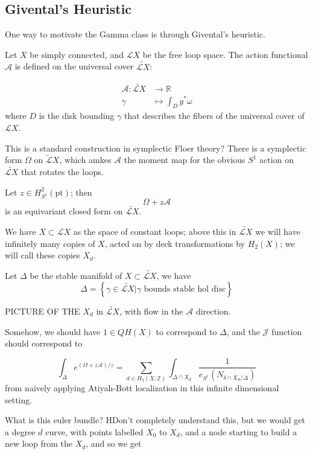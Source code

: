 \documentclass{amsart}
\theoremstyle{definition}
\newcommand{\Z}{\mathbb{Z}}
\newcommand{\R}{\mathbb{R}}
\newcommand{\J}{\mathcal{J}}
\newcommand{\one}{1}
\begin{document}
\subsection{Givental's Heuristic}
One way to motivate the Gamma class is through Givental's heuristic.

Let $X$ be simply connected, and $\mathcal{L}X$ be the free loop space.  The action functional $\mathcal{A}$ is defined on the universal cover $\widetilde{\mathcal{L}X}$:

\begin{align*}
\mathcal{A}:\widetilde{\mathcal{L}X}&\to\R \\
\gamma&\mapsto \int_D g^*\omega
\end{align*}
where $D$ is the disk bounding $\gamma$ that describes the fibers of the universal cover of $\mathcal{L}X$.

This is a standard construction in symplectic Floer theory?
There is a symplectic form $\Omega$ on $\widetilde{\mathcal{L}}X$, which amkes $\mathcal{A}$ the moment map for the obvious $S^1$ action on $\widetilde{\mathcal{L}X}$ that rotates the loops.

Let $z\in H^2_{S^1}(\text{pt})$; then $$\Omega+z\mathcal{A}$$ is an equivariant closed form on $\widetilde{\mathcal{L}X}$.



We have $X\subset \mathcal{L}X$ as the space of constant loops; above this in $ \widetilde{\mathcal{L}X}$ we will have infinitely many copies of $X$, acted on by deck transformations by $H_2(X)$; we will call these copies $X_d$.

Let $\Delta$ be the stable manifold of $X\subset \widetilde{\mathcal{L}X}$, we have
$$\Delta=\left\{\gamma\in\widetilde{\mathcal{L}X}|\gamma \text{ bounds stable hol disc}\right\}$$

PICTURE OF THE $X_d$ in $\widetilde{\mathcal{L}X}$, with flow in the $\mathcal{A}$ direction.

Somehow, we should have $\one\in QH(X)$ to correspond to $\Delta$, and the $\J$ function should correspond to

$$\int_\Delta e^{(\Omega+z\mathcal{A})/z}=\sum_{d\in H_2(X;\Z)}\int_{\Delta\cap X_d}\frac{1}{e_{S^1}(N_{\delta\cap X_d/\Delta})}$$
from naively applying Atiyah-Bott localization in this infinite dimensional setting.

What is this euler bundle?  HDon't completely understand this, but we would get a degree $d$ curve, with points labelled $X_0$ to $X_d$, and a node starting to build a new loop from the $X_d$, and so we get
\end{document}
